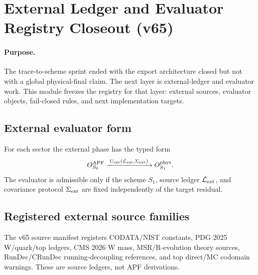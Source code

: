 
\section{External Ledger and Evaluator Registry Closeout (v65)}
\label{sec:v65-external-ledger-evaluator-registry}

\paragraph{Purpose.}
The trace-to-scheme sprint ended with the export architecture closed but not with a global physical-final claim.  The next layer is external-ledger and evaluator work.  This module freezes the registry for that layer: external sources, evaluator objects, fail-closed rules, and next implementation targets.

\begin{center}
\end{center}

\subsection{External evaluator form}
For each sector the external phase has the typed form
\[
  O^{\rm APF}_{S_0}\xrightarrow{\;U_{\rm ext}(\mathcal L_{\rm ext},\Sigma_{\rm ext})\;}O^{\rm phys}_{S_1}.
\]
The evaluator is admissible only if the scheme $S_1$, source ledger $\mathcal L_{\rm ext}$, and covariance protocol $\Sigma_{\rm ext}$ are fixed independently of the target residual.

\subsection{Registered external source families}
The v65 source manifest registers CODATA/NIST constants, PDG 2025 W/quark/top ledgers, CMS 2026 W mass, MSR/R-evolution theory sources, RunDec/CRunDec running-decoupling references, and top direct/MC codomain warnings.  These are source ledgers, not APF derivations.

